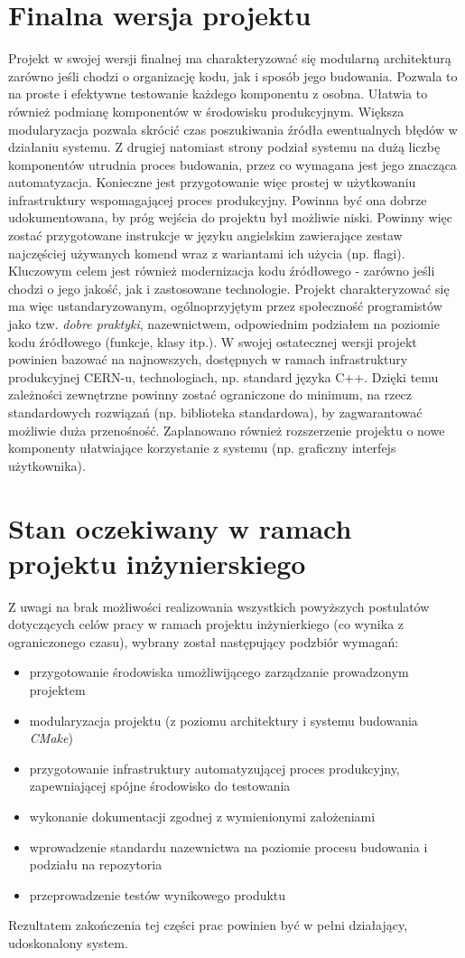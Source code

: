 \section{Finalna wersja projektu}
Projekt w swojej wersji finalnej ma charakteryzować się modularną architekturą zarówno jeśli chodzi o organizację kodu, jak i sposób jego budowania. Pozwala to na proste i efektywne testowanie każdego komponentu z osobna. Ułatwia to również podmianę komponentów w środowisku produkcyjnym. Większa modularyzacja pozwala skrócić czas poszukiwania źródła ewentualnych błędów w działaniu systemu. Z drugiej natomiast strony podział systemu na dużą liczbę komponentów utrudnia proces budowania, przez co wymagana jest jego znacząca automatyzacja. Konieczne jest przygotowanie więc prostej w użytkowaniu infrastruktury wspomagającej proces produkcyjny. Powinna być ona dobrze udokumentowana, by próg wejścia do projektu był możliwie niski. Powinny więc zostać przygotowane instrukcje w języku angielskim zawierające zestaw najczęściej używanych komend wraz z wariantami ich użycia (np. flagi). Kluczowym celem jest również modernizacja kodu źródłowego - zarówno jeśli chodzi o jego jakość, jak i zastosowane technologie. Projekt charakteryzować się ma więc ustandaryzowanym, ogólnoprzyjętym przez społeczność programistów jako tzw. \textit{dobre praktyki}, nazewnictwem, odpowiednim podziałem na poziomie kodu źródłowego (funkcje, klasy itp.). W swojej ostatecznej wersji projekt powinien bazować na najnowszych, dostępnych w ramach infrastruktury produkcyjnej CERN-u, technologiach, np. standard języka C++. Dzięki temu zależności zewnętrzne powinny zostać ograniczone do minimum, na rzecz standardowych rozwiązań (np. biblioteka standardowa), by zagwarantować możliwie duża przenośność. Zaplanowano również rozszerzenie projektu o nowe komponenty ułatwiające korzystanie z systemu (np. graficzny interfejs użytkownika).

\section{Stan oczekiwany w ramach projektu inżynierskiego}
Z uwagi na brak możliwości realizowania wszystkich powyższych postulatów dotyczących celów pracy w ramach projektu inżynierkiego (co wynika z ograniczonego czasu), wybrany został następujący podzbiór wymagań:
\begin{itemize}
\item przygotowanie środowiska umożliwijącego zarządzanie prowadzonym projektem
\item modularyzacja projektu (z poziomu architektury i systemu budowania \textit{CMake})
\item przygotowanie infrastruktury automatyzującej proces produkcyjny, zapewniającej spójne środowisko do testowania
\item wykonanie dokumentacji zgodnej z wymienionymi założeniami
\item wprowadzenie standardu nazewnictwa na poziomie procesu budowania i podziału na repozytoria
\item przeprowadzenie testów wynikowego produktu
\end{itemize}
Rezultatem zakończenia tej części prac powinien być w pełni działający, udoskonalony system.


